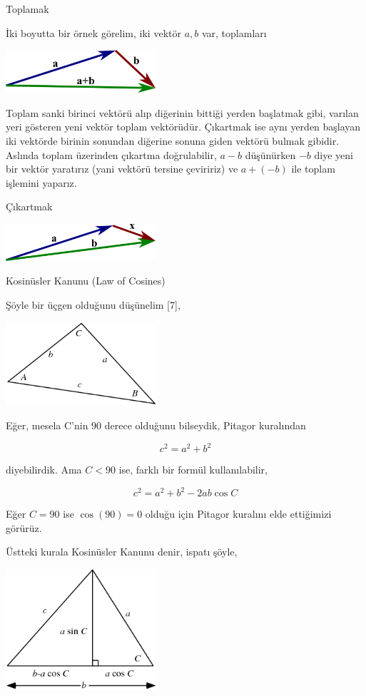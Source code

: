 \documentclass[12pt,fleqn]{article}\usepackage{../../common}
\begin{document}
Toplamak

İki boyutta bir örnek görelim, iki vektör $a,b$ var, toplamları

\includegraphics[width=15em]{vector_a_plus_b.png}

Toplam sanki birinci vektörü alıp diğerinin bittiği yerden başlatmak gibi,
varılan yeri gösteren yeni vektör toplam vektörüdür. Çıkartmak ise aynı yerden
başlayan iki vektörde birinin sonundan diğerine sonuna giden vektörü bulmak
gibidir. Aslında toplam üzerinden çıkartma doğrulabilir, $a-b$ düşünürken $-b$
diye yeni bir vektör yaratırız (yani vektörü tersine çeviririz) ve $a+(-b)$ ile
toplam işlemini yaparız.

Çıkartmak

\includegraphics[width=15em]{vector_b_minus_a.png}

Kosinüsler Kanunu (Law of Cosines)

Şöyle bir üçgen olduğunu düşünelim [7],

\includegraphics[width=15em]{cos1.png}

Eğer, mesela C'nin 90 derece olduğunu bilseydik, Pitagor kuralından

$$
c^2 = a^2 + b^2
$$

diyebilirdik. Ama $C < 90$ ise, farklı bir formül kullanılabilir,

$$
c^2 = a^2 + b^2 - 2 a b \cos C
$$

Eğer $C=90$ ise $\cos(90) = 0$ olduğu için Pitagor kuralını elde ettiğimizi
görürüz. 

Üstteki kurala Kosinüsler Kanunu denir, ispatı şöyle,

\includegraphics[width=15em]{cos2.png}
\end{document}
